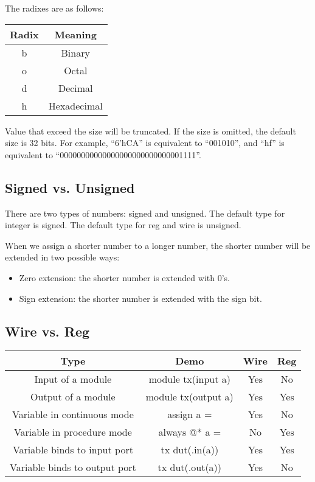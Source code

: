 \documentclass[a4paper,12pt]{article}
\begin{document}
The radixes are as follows:
\begin{center}
	\begin{tabular}{cc}
		\toprule
		Radix & Meaning \\
		\midrule
		b & Binary \\
		o & Octal \\
		d & Decimal \\
		h & Hexadecimal \\
		\bottomrule
	\end{tabular}
\end{center}

Value that exceed the size will be truncated.
If the size is omitted, the default size is 32 bits.
For example, ``6’hCA'' is equivalent to ``001010'', and ``hf'' is equivalent to ``00000000000000000000000000001111''.

\subsection{Signed vs. Unsigned}

There are two types of numbers: signed and unsigned.
The default type for integer is signed.
The default type for reg and wire is unsigned.

When we assign a shorter number to a longer number, the shorter number will be extended in two possible ways:
\begin{itemize}
	\item Zero extension: the shorter number is extended with 0's.
	\item Sign extension: the shorter number is extended with the sign bit.
\end{itemize}

\subsection{Wire vs. Reg}

\begin{center}
	\begin{tabular}{cccc}
		\toprule
		Type & Demo & Wire & Reg \\
		\midrule
		Input of a module & module tx(input a) & Yes & No \\
		Output of a module & module tx(output a) & Yes & Yes \\
		Variable in continuous mode & assign a =  & Yes & No \\
		Variable in procedure mode & always @* a = & No & Yes \\
		Variable binds to input port & tx dut(.in(a)) & Yes & Yes \\
		Variable binds to output port & tx dut(.out(a)) & Yes & No \\
		\bottomrule
	\end{tabular}
\end{center}
\end{document}

